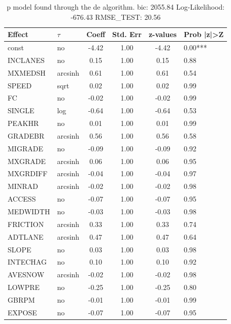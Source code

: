 \begin{table}
	\caption{p model found through the de algorithm. bic: 2055.84 Log-Likelihood: -676.43 RMSE_TEST: 20.56}
	\begin{center}
		\begin{tabular}{|l|l|c|c|c|l|}
			\hline
			Effect & $\tau$ & Coeff & Std. Err & z-values & Prob |z|>Z \\
			\hline
			const & no & -4.42 & 1.00 & -4.42 & 0.00*** \\
			\hline
			INCLANES & no & 0.15 & 1.00 & 0.15 & 0.88 \\
			\hline
			MXMEDSH & arcsinh & 0.61 & 1.00 & 0.61 & 0.54 \\
			\hline
			SPEED & sqrt & 0.02 & 1.00 & 0.02 & 0.99 \\
			\hline
			FC & no & -0.02 & 1.00 & -0.02 & 0.99 \\
			\hline
			SINGLE & log & -0.64 & 1.00 & -0.64 & 0.53 \\
			\hline
			PEAKHR & no & 0.01 & 1.00 & 0.01 & 0.99 \\
			\hline
			GRADEBR & arcsinh & 0.56 & 1.00 & 0.56 & 0.58 \\
			\hline
			MIGRADE & no & -0.09 & 1.00 & -0.09 & 0.92 \\
			\hline
			MXGRADE & arcsinh & 0.06 & 1.00 & 0.06 & 0.95 \\
			\hline
			MXGRDIFF & arcsinh & -0.04 & 1.00 & -0.04 & 0.97 \\
			\hline
			MINRAD & arcsinh & -0.02 & 1.00 & -0.02 & 0.98 \\
			\hline
			ACCESS & no & -0.07 & 1.00 & -0.07 & 0.95 \\
			\hline
			MEDWIDTH & no & -0.03 & 1.00 & -0.03 & 0.98 \\
			\hline
			FRICTION & arcsinh & 0.33 & 1.00 & 0.33 & 0.74 \\
			\hline
			ADTLANE & arcsinh & 0.47 & 1.00 & 0.47 & 0.64 \\
			\hline
			SLOPE & no & 0.03 & 1.00 & 0.03 & 0.98 \\
			\hline
			INTECHAG & no & 0.10 & 1.00 & 0.10 & 0.92 \\
			\hline
			AVESNOW & arcsinh & -0.02 & 1.00 & -0.02 & 0.98 \\
			\hline
			LOWPRE & no & -0.25 & 1.00 & -0.25 & 0.80 \\
			\hline
			GBRPM & no & -0.01 & 1.00 & -0.01 & 0.99 \\
			\hline
			EXPOSE & no & -0.07 & 1.00 & -0.07 & 0.95 \\
			\hline

\end{tabular}
\end{center}
\end{table}
